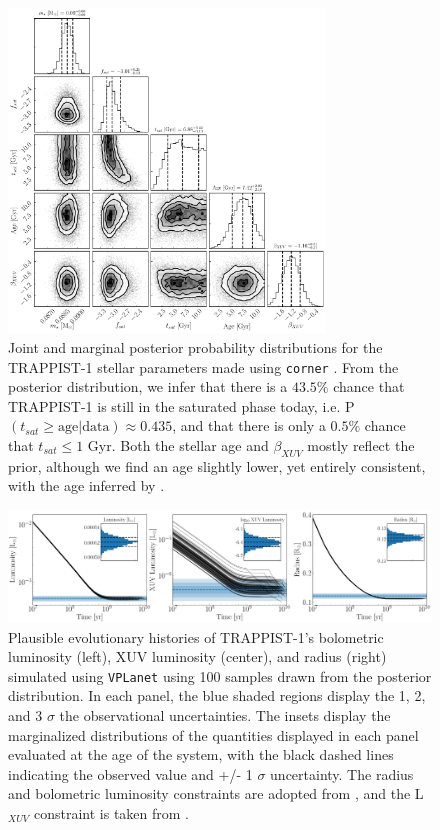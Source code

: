 \documentclass[twocolumn]{aastex62}
\newcommand{\vplanet}[0]{\texttt{VPLanet}\xspace}
\begin{document}
\begin{figure}[t]
\centering
	\includegraphics[width=0.75\textwidth]{../Analysis/Corner/trappist1Corner.pdf}
   \caption{Joint and marginal posterior probability distributions for the TRAPPIST-1 stellar parameters made using \texttt{corner} \citep{ForemanMackey2016}. From the posterior distribution, we infer that there is a $43.5\%$ chance that TRAPPIST-1 is still in the saturated phase today, i.e. P$(t_{sat} \geq \mathrm{ age } | \mathrm{data}) \approx 0.435$, and that there is only a $0.5\%$ chance that $t_{sat} \leq 1$ Gyr. Both the stellar age and $\beta_{XUV}$ mostly reflect the prior, although we find an age slightly lower, yet entirely consistent, with the age inferred by \citet{Burgasser2017}.}%
    \label{fig:corner}%
\end{figure}


\begin{figure}[t]
	\includegraphics[width=\textwidth]{../Analysis/Evol/trappist1Evol.pdf}
   \caption{Plausible evolutionary histories of TRAPPIST-1's bolometric luminosity (left), XUV luminosity (center), and radius (right) simulated using \vplanet using 100 samples drawn from the posterior distribution. In each panel, the blue shaded regions display the 1, 2, and 3 $\sigma$ the observational uncertainties. The insets display the marginalized distributions of the quantities displayed in each panel evaluated at the age of the system, with the black dashed lines indicating the observed value and +/- 1 $\sigma$ uncertainty. The radius and bolometric luminosity constraints are adopted from \citet{vanGrootel2018}, and the L$_{XUV}$ constraint is taken from \citet{Wheatley2017}.}%
    \label{fig:evol}%
\end{figure}
\end{document}
